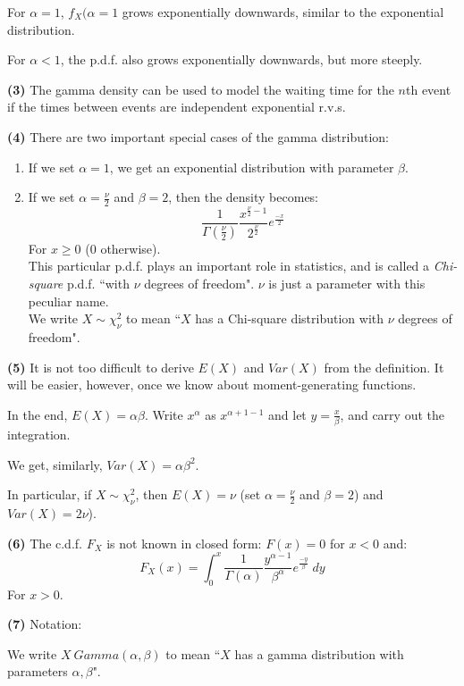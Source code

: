 \documentclass[12pt]{article}
\begin{document}
For $\alpha = 1$, $f_X (\alpha = 1$ grows exponentially downwards, similar to the exponential distribution.

For $\alpha < 1$, the p.d.f. also grows exponentially downwards, but more steeply.

\textbf{(3)}
The gamma density can be used to model the waiting time for the $n$th event if the times between events are independent exponential r.v.s.

\textbf{(4)}
There are two important special cases of the gamma distribution:
\begin{enumerate}
    \item If we set $\alpha = 1$, we get an exponential distribution with parameter $\beta$.
    \item If we set $\alpha = \frac{\nu}{2}$ and $\beta = 2$, then the density becomes:
        \[
            \frac{1}{\Gamma(\frac{\nu}{2})} \frac{x^{\frac{\nu}{2} - 1}}{2^{\frac{\nu}{2}}} e^{\frac{-x}{2}}
        \]
        For $x \geq 0$ (0 otherwise). \\
        This particular p.d.f. plays an important role in statistics, and is called a \emph{Chi-square} p.d.f. ``with $\nu$ degrees of freedom". $\nu$ is just a parameter with this peculiar name. \\
        We write $X \sim \chi_{\nu}^2$ to mean ``$X$ has a Chi-square distribution with $\nu$ degrees of freedom".
\end{enumerate}

\textbf{(5)}
It is not too difficult to derive $E(X)$ and $Var(X)$ from the definition. It will be easier, however, once we know about moment-generating functions.

In the end, $E(X) = \alpha \beta$. Write $x^{\alpha}$ as $x^{\alpha + 1 - 1}$ and let $y = \frac{x}{\beta}$, and carry out the integration.

We get, similarly, $Var(X) = \alpha \beta^2$.

In particular, if $X \sim \chi_{\nu}^2$, then $E(X) = \nu$ (set $\alpha = \frac{\nu}{2}$ and $\beta = 2$) and $Var(X) = 2 \nu$).

\textbf{(6)}
The c.d.f. $F_X$ is not known in closed form: $F(x) = 0$ for $x<0$ and:
\[
    F_X (x) = \int_0^x \frac{1}{\Gamma(\alpha)} \frac{y^{\alpha - 1}}{\beta^{\alpha}} e^{\frac{-y}{\beta}} \; dy
\]
For $x>0$.

\textbf{(7)} Notation:

We write $X ~ Gamma(\alpha, \beta)$ to mean ``$X$ has a gamma distribution with parameters $\alpha, \beta$".
\end{document}
